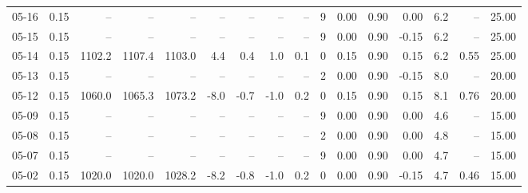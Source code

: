 \begin{threeparttable}
{\begin{tabular}{lrrrrrrrrrrrrrrr}
  05-16 &     0.15 &     -- &     -- &     -- &         -- &             -- &                       -- &                  -- &              9 &       0.00 &      0.90 &           0.00 &              6.2 &              -- &                  25.00 \\
  05-15 &     0.15 &     -- &     -- &     -- &         -- &             -- &                       -- &                  -- &              9 &       0.00 &      0.90 &          -0.15 &              6.2 &              -- &                  25.00 \\
  05-14 &     0.15 & 1102.2 & 1107.4 & 1103.0 &        4.4 &            0.4 &                      1.0 &                 0.1 &              0 &       0.15 &      0.90 &           0.15 &              6.2 &            0.55 &                  25.00 \\
  05-13 &     0.15 &     -- &     -- &     -- &         -- &             -- &                       -- &                  -- &              2 &       0.00 &      0.90 &          -0.15 &              8.0 &              -- &                  20.00 \\
  05-12 &     0.15 & 1060.0 & 1065.3 & 1073.2 &       -8.0 &           -0.7 &                     -1.0 &                 0.2 &              0 &       0.15 &      0.90 &           0.15 &              8.1 &            0.76 &                  20.00 \\
  05-09 &     0.15 &     -- &     -- &     -- &         -- &             -- &                       -- &                  -- &              9 &       0.00 &      0.90 &           0.00 &              4.6 &              -- &                  15.00 \\
  05-08 &     0.15 &     -- &     -- &     -- &         -- &             -- &                       -- &                  -- &              2 &       0.00 &      0.90 &           0.00 &              4.8 &              -- &                  15.00 \\
  05-07 &     0.15 &     -- &     -- &     -- &         -- &             -- &                       -- &                  -- &              9 &       0.00 &      0.90 &           0.00 &              4.7 &              -- &                  15.00 \\
  05-02 &     0.15 & 1020.0 & 1020.0 & 1028.2 &       -8.2 &           -0.8 &                     -1.0 &                 0.2 &              0 &       0.00 &      0.90 &          -0.15 &              4.7 &            0.46 &                  15.00 \\

\end{tabular}}
\end{threeparttable}
